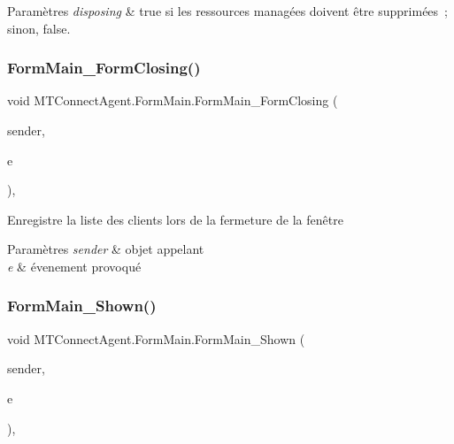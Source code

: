 \begin{DoxyParams}{Paramètres}
{\em disposing} & true si les ressources managées doivent être supprimées ; sinon, false.\\
\hline
\end{DoxyParams}
\mbox{\label{class_m_t_connect_agent_1_1_form_main_a7bf61fab117d7928a7f0cc0eca0d2189}} 
\subsubsection{\texorpdfstring{Form\+Main\+\_\+\+Form\+Closing()}{FormMain\_FormClosing()}}
{\footnotesize\ttfamily void M\+T\+Connect\+Agent.\+Form\+Main.\+Form\+Main\+\_\+\+Form\+Closing (\begin{DoxyParamCaption}\item[{object}]{sender,  }\item[{Form\+Closing\+Event\+Args}]{e }\end{DoxyParamCaption})\hspace{0.3cm}{\ttfamily [inline]}, {\ttfamily [private]}}



Enregistre la liste des clients lors de la fermeture de la fenêtre 


\begin{DoxyParams}{Paramètres}
{\em sender} & objet appelant\\
\hline
{\em e} & évenement provoqué\\
\hline
\end{DoxyParams}
\mbox{\label{class_m_t_connect_agent_1_1_form_main_a6135a4be969947c0c26db758ba0acaed}} 
\subsubsection{\texorpdfstring{Form\+Main\+\_\+\+Shown()}{FormMain\_Shown()}}
{\footnotesize\ttfamily void M\+T\+Connect\+Agent.\+Form\+Main.\+Form\+Main\+\_\+\+Shown (\begin{DoxyParamCaption}\item[{object}]{sender,  }\item[{Event\+Args}]{e }\end{DoxyParamCaption})\hspace{0.3cm}{\ttfamily [inline]}, {\ttfamily [private]}}



